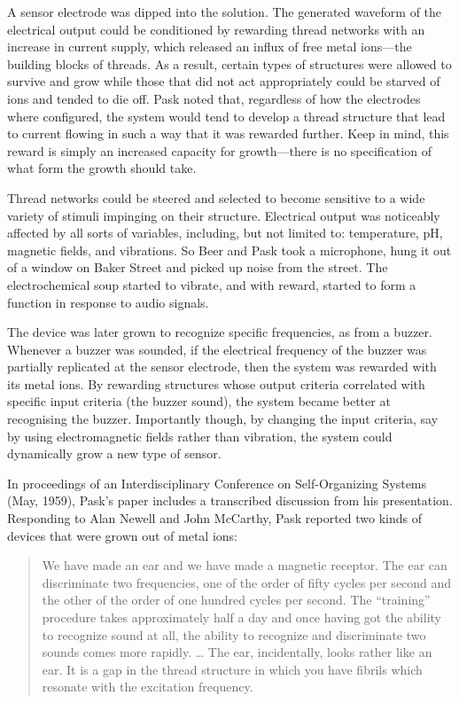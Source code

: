 A sensor electrode was dipped into the solution.
The generated waveform of the electrical output could be conditioned by rewarding thread networks with an increase in current supply, which released an influx of free metal ions---the building blocks of threads.
As a result, certain types of structures were allowed to survive and grow while those that did not act appropriately could be
starved of ions and tended to die off. 
Pask noted that, regardless of how the electrodes where configured, the system would tend to develop a thread structure that lead to current flowing in such a way that it was rewarded further.
Keep in mind, this reward is simply an increased capacity for growth---there is no specification of what form the growth should take. 

Thread networks could be steered and selected to become sensitive to a wide variety of stimuli impinging on their structure.
Electrical output was noticeably affected by all sorts of variables, including, but not limited to: temperature, pH, magnetic fields, and vibrations.
So Beer and Pask took a microphone, 
hung it out of a window on Baker Street
and picked up noise from the street.
The electrochemical soup started to vibrate, and with reward, started to form a function in response to audio signals.

The device was later grown to recognize specific frequencies, as from a buzzer.
Whenever a buzzer was sounded,
if the electrical frequency of the buzzer was partially replicated at the sensor electrode, 
then the system was rewarded with its metal ions. 
By rewarding structures whose
output criteria correlated with specific input criteria (the buzzer sound), the system became better at recognising the buzzer.
Importantly though, by changing the input criteria, say by using electromagnetic fields rather than vibration, the system could dynamically grow a new type of sensor.

In proceedings of an Interdisciplinary Conference on Self-Organizing Systems 
(May, 1959),
Pask's paper \cite{pask1960natural} includes a transcribed discussion from his presentation.
Responding to Alan Newell and John McCarthy, Pask reported two kinds of devices that were grown out of metal ions:
\begin{quote}
\small
We have made an ear and we have made a magnetic receptor. The
ear can discriminate two frequencies, one of the order of fifty cycles per second and the other of the order of one hundred cycles per second. 
The ``training'' procedure takes approximately half a day and once having got the ability to recognize sound at all, the ability to recognize and discriminate two sounds comes more rapidly. 
\dots
The ear, incidentally, looks rather like an ear. It is a gap in the thread structure in which you have fibrils which resonate with the excitation frequency.
\end{quote}


